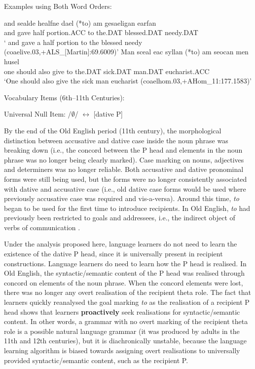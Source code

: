 	\begin{exe}
		\ex Examples using Both Word Orders:
		\begin{xlist}
			\ex \gll and sealde healfne dael (*to) \TH am gesaeligan \TH earfan\\
			and gave half portion.ACC to the.DAT blessed.DAT needy.DAT\\
			\trans ` and gave a half portion to the blessed needy (coaelive.03,+ALS\_[Martin]:69.6009)'
			\ex \gll Man sceal eac syllan (*to) \TH am seocan men husel\\
			one should also give to the.DAT sick.DAT man.DAT eucharist.ACC\\
			\trans `One should also give the sick man eucharist (coaelhom.03,+AHom\_11:177.1583)'
		\end{xlist}
		\ex Vocabulary Items (6th--11th Centuries):\label{ex:old-eng-vi}
		\begin{xlist}
			\ex Universal Null Item:  /$\emptyset$/ $\leftrightarrow$ [dative P]
		\end{xlist}
	\end{exe}
	
	By the end of the Old English period (11th century), the morphological distinction between accusative and dative case inside the noun phrase was breaking down (i.e., the concord between the P head and elements in the noun phrase was no longer being clearly marked). Case marking on nouns, adjectives and determiners was no longer reliable. Both accusative and dative pronominal forms were still being used, but the forms were no longer consistently associated with dative and accusative case (i.e., old dative case forms would be used where previously accusative case was required and vis-a-versa). Around this time, \textit{to} began to be used for the first time to introduce recipients. In Old English, \textit{to} had previously been restricted to goals and addressees, i.e., the indirect object of verbs of communication \citep{Allen.1999,McFadden.2002,OED.2013}. 
	
	Under the analysis proposed here, language learners do not need to learn the existence of the dative P head, since it is universally present in recipient constructions. Language learners do need to learn how the P head is realised. In Old English, the syntactic/semantic content of the P head was realised through concord on elements of the noun phrase. When the concord elements were lost, there was no longer any overt realisation of the recipient theta role. The fact that learners quickly reanalysed the goal marking \textit{to} as the realisation of a recipient P head shows that learners \textbf{proactively} seek realisations for syntactic/semantic content. In other words, a grammar with no overt marking of the recipient theta role is a possible natural language grammar (it was produced by adults in the 11th and 12th centuries), but it is diachronically unstable, because the language learning algorithm is biased towards assigning overt realisations to universally provided syntactic/semantic content, such as the recipient P.

